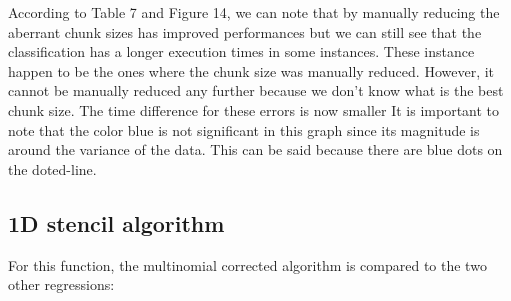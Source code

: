 According to Table 7 and Figure 14, we can note that by manually reducing the aberrant chunk sizes has improved performances but we can still see that the classification has  a longer execution times in some instances. These instance happen to be the ones where the chunk size was manually reduced. However, it cannot be manually reduced any further because we don't know what is the best chunk size. The time difference for these errors is now smaller It is important to note that the color blue is not significant in this graph since its magnitude is around the variance of the data. This can be said because there are blue dots on the doted-line.
\subsection{1D stencil algorithm}
For this function, the multinomial corrected algorithm is compared to the two other regressions:

